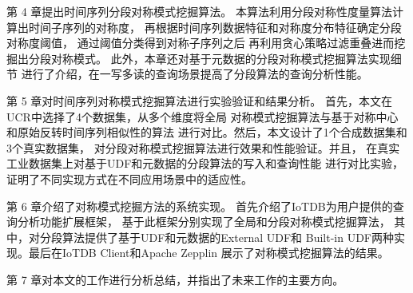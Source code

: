
第 4 章提出时间序列分段对称模式挖掘算法。
本算法利用分段对称性度量算法计算出时间子序列的对称度，
再根据时间序列数据特征和对称度分布特征确定分段对称度阈值，
通过阈值分类得到对称子序列之后
再利用贪心策略过滤重叠进而挖掘出分段对称模式。
此外，本章还对基于元数据的分段对称模式挖掘算法实现细节
进行了介绍，在一写多读的查询场景提高了分段算法的查询分析性能。

第 5 章对时间序列对称模式挖掘算法进行实验验证和结果分析。
首先，本文在UCR中选择了4个数据集，从多个维度将全局
对称模式挖掘算法与基于对称中心和原始反转时间序列相似性的算法
进行对比。然后，本文设计了1个合成数据集和3个真实数据集，
对分段对称模式挖掘算法进行效果和性能验证。并且，
在真实工业数据集上对基于UDF和元数据的分段算法的写入和查询性能
进行对比实验，证明了不同实现方式在不同应用场景中的适应性。

第 6 章介绍了对称模式挖掘方法的系统实现。
首先介绍了IoTDB为用户提供的查询分析功能扩展框架，
基于此框架分别实现了全局和分段对称模式挖掘算法，
其中，对分段算法提供了基于UDF和元数据的External UDF和
Built-in UDF两种实现。最后在IoTDB Client和Apache Zepplin
\cite{DBLP:conf/xsede/ChengLJXC18}
展示了对称模式挖掘算法的结果。

第 7 章对本文的工作进行分析总结，并指出了未来工作的主要方向。 
